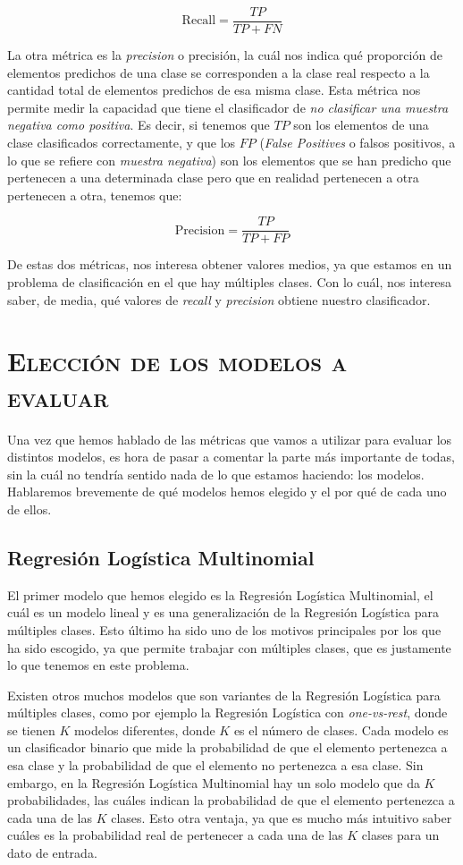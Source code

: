 \documentclass[11pt,a4paper]{article}
\begin{document}
\[ 
\text{Recall} = \frac{TP}{TP + FN}
\]

La otra métrica es la \textit{precision} o precisión, la cuál nos indica qué proporción de elementos predichos de una clase se corresponden
a la clase real respecto a la cantidad total de elementos predichos de esa misma clase. Esta métrica nos permite medir la capacidad que tiene
el clasificador de \textit{no clasificar una muestra negativa como positiva}\cite{bib:precision}. Es decir, si tenemos que $TP$ son los
elementos de una clase clasificados correctamente, y que los $FP$ (\textit{False Positives} o falsos positivos, a lo que se refiere con
\textit{muestra negativa}) son los elementos que se han predicho que pertenecen a una determinada clase pero que en realidad pertenecen a
otra pertenecen a otra, tenemos que:

\[ 
\text{Precision} = \frac{TP}{TP + FP}
\]

De estas dos métricas, nos interesa obtener valores medios, ya que estamos en un problema de clasificación en el que hay múltiples clases.
Con lo cuál, nos interesa saber, de media, qué valores de \textit{recall} y \textit{precision} obtiene nuestro clasificador.

\section{\textsc{Elección de los modelos a evaluar}}

Una vez que hemos hablado de las métricas que vamos a utilizar para evaluar los distintos modelos, es hora de pasar a comentar la parte más
importante de todas, sin la cuál no tendría sentido nada de lo que estamos haciendo: los modelos. Hablaremos brevemente de qué modelos hemos
elegido y el por qué de cada uno de ellos.

\subsection{Regresión Logística Multinomial}

El primer modelo que hemos elegido es la Regresión Logística Multinomial, el cuál es un modelo lineal y es una generalización de la Regresión
Logística para múltiples clases. Esto último ha sido uno de los motivos principales por los que ha sido escogido, ya que permite trabajar con
múltiples clases, que es justamente lo que tenemos en este problema.

Existen otros muchos modelos que son variantes de la Regresión Logística para múltiples clases, como por ejemplo la Regresión Logística con
\textit{one-vs-rest}, donde se tienen $K$ modelos diferentes, donde $K$ es el número de clases. Cada modelo es un clasificador binario que
mide la probabilidad de que el elemento pertenezca a esa clase y la probabilidad de que el elemento no pertenezca a esa clase. Sin embargo,
en la Regresión Logística Multinomial hay un solo modelo que da $K$ probabilidades, las cuáles indican la probabilidad de que el elemento
pertenezca a cada una de las $K$ clases. Esto otra ventaja, ya que es mucho más intuitivo saber cuáles es la probabilidad real de pertenecer
a cada una de las $K$ clases para un dato de entrada.
\end{document}
